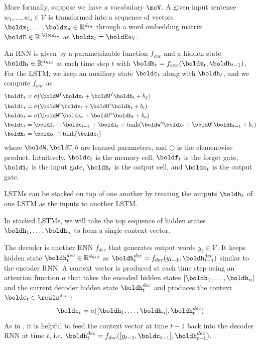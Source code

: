 \documentclass[12pt]{report}
\begin{document}
More formally, suppose we have a vocabulary $\mcV$. A given input sentence $w_1, \ldots, w_n \in \mathcal{V}$ is transformed into a sequence of vectors $\boldx_1, \ldots, \boldx_n \in \mathbb{R}^{d_{in}}$ through a word embedding matrix $\boldE \in \mathbb{R}^{|\mathcal{V}| \times d_{in}}$ as $\boldx_t = \boldE w_t$.

An RNN is given by a parametrizable function $f_{enc}$ and a hidden state $\boldh_t \in \mathbb{R}^{ d_{hid}}$ at each time step $t$ with $\boldh_t = f_{enc}(\boldx_t, \boldh_{t-1})$. For the LSTM, we keep an auxiliary state $\boldc_t$ along with $\boldh_t$, and we compute $f_{enc}$ as
\begin{align}
\boldf_t &= \sigma(\boldW^f \boldx_t + \boldU^f \boldh_t + b_f) \\
\boldi_t &= \sigma(\boldW^i \boldx_t + \boldU^i \boldh_t + b_i) \\
\boldo_t &= \sigma(\boldW^o \boldx_t + \boldU^o \boldh_t + b_o) \\
\boldc_t &= \boldf_t \odot \boldc_{t-1}  + \boldi_t \odot \tanh(\boldW^c \boldx_t + \boldU^c \boldh_{t-1} + b_c) \\
\boldh_t &= \boldo_t \odot \tanh(\boldc_t)
\end{align}
where $\boldW, \boldU, b$ are learned parameters, and $\odot$ is the elementwise product. 
Intuitively, $\boldc_t$ is the memory cell, $\boldf_t$ is the forget gate, $\boldi_t$ is the input gate, $\boldh_t$ is the output cell, and $\boldo_t$ is the output gate.

LSTMs can be stacked on top of one another by treating the outputs $\boldh_t$ of one LSTM as the inputs to another LSTM.

In stacked LSTMs, we will take the top sequence of hidden states $\boldh_1, \ldots, \boldh_n$ to form a single context vector.


The decoder is another RNN $f_{dec}$ that generates output words $y_t \in \mathcal{V}$. It keeps hidden state $\boldh_t^{dec} \in \mathbb{R}^{d_{hid}}$ as $\boldh_t^{dec} = f_{dec}(y_{t-1}, \boldh_{t-1}^{dec})$ similar to the encoder RNN.
A context vector is produced at each time step using an attention function $a$ that takes the encoded hidden states $[\boldh_1, \ldots, \boldh_n]$ and the current decoder hidden state $\boldh_t^{dec}$ and produces the context $\boldc_t \in \reals^{d_{ctx}}$:
\begin{equation}
\boldc_t = a([\boldh_1, \ldots, \boldh_n], \boldh_t^{dec})
\end{equation}
As in \citet{luong2015effective}, it is helpful to feed the context vector at time $t-1$ back into the decoder RNN at time $t$, i.e. $\boldh_t^{dec} = f_{dec}([y_{t-1}, \boldc_{t-1}], \boldh_{t-1}^{dec})$.
\end{document}
